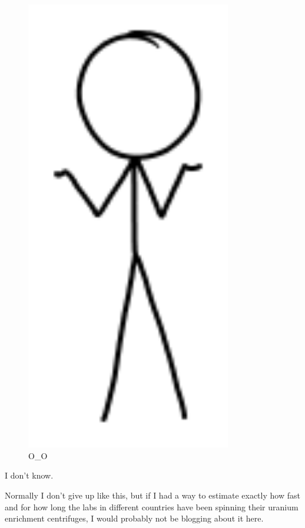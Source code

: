 {\begin{figure}[!htbp]
\centering
\includegraphics[scale=0.5, max width=0.8\textwidth]{imgs/a/86/far_dunno.png}
\caption{O\_O}%
\end{figure}

{I don't know.}

{Normally I don't give up like this, but if I had a way to estimate exactly how fast and for how long the labs in different countries have been spinning their uranium enrichment centrifuges, I would probably not be blogging about it here.}

}
